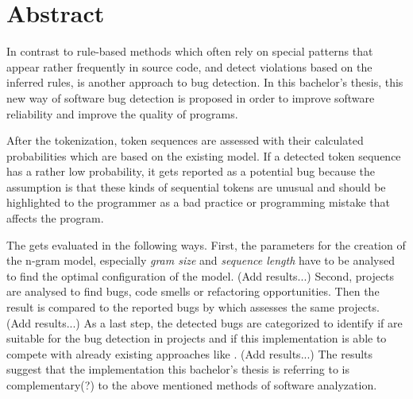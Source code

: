 \chapter*{Abstract}

In contrast to rule-based methods which often rely on special patterns that appear rather frequently in source code, and detect violations based on the inferred rules, \ngram{} is another approach to bug detection. In this bachelor's thesis, this new way of software bug detection is proposed in order to improve software reliability and improve the quality of \scratch{} programs.

After the tokenization, token sequences are assessed with their calculated probabilities which are based on the existing model. If a detected token sequence has a rather low probability, it gets reported as a potential bug because the assumption is that these kinds of sequential tokens are unusual and should be highlighted to the programmer as a bad practice or programming mistake that affects the program.

The \ngram{} gets evaluated in the following ways. First, the parameters for the creation of the n-gram model, especially \textit{gram size} and \textit{sequence length} have to be analysed to find the optimal configuration of the model. (Add results...) Second, \scratch{} projects are analysed to find bugs, code smells or refactoring opportunities. Then the result is compared to the reported bugs by \litterbox{} which assesses the same projects. (Add results...) As a last step, the detected bugs are categorized to identify if  are suitable for the bug detection in \scratch{} projects and if this implementation is able to compete with already existing approaches like \litterbox{}. (Add results...) The results suggest that the implementation this bachelor's thesis is referring to is complementary(?) to the above mentioned methods of software analyzation.